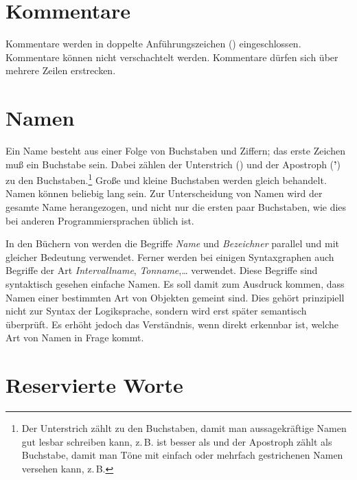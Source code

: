 \section{Kommentare}\label{sec:kommentare}
\label{zweizwei}

Kommentare werden in doppelte Anführungszeichen (\sourcecode{\dq})
eingeschlossen.
Kommentare  k\"onnen  nicht
verschachtelt werden.
Kommentare dürfen sich über mehrere Zeilen erstrecken.

\section{Namen}\label{sec:namen}
\label{zweidrei}

Ein Name besteht aus einer Folge von
Buchstaben und Ziffern;  das
erste Zeichen mu\ss{} ein Buchstabe sein.  Dabei z\"ahlen
der Unterstrich  (\sourcecode{_}) und der Apostroph
(\textbf{'})
zu den Buchstaben.\footnote{Der Unterstrich zählt zu den Buchstaben, damit
man aussagekräftige Namen gut lesbar schreiben kann, z.\,B.
 ist besser als
und der Apostroph zählt als Buchstabe,
damit man Töne mit einfach oder mehrfach gestrichenen
Namen versehen kann, z.\,B. }
Gro\ss{}e und kleine Buchstaben werden gleich behandelt.
Namen können beliebig lang sein.
Zur  Unterscheidung von Namen wird der gesamte Name herangezogen,
und nicht nur die ersten paar Buchstaben, wie dies bei anderen
Programmiersprachen üblich ist.

In den Büchern von \mutabor{} werden die Begriffe \emph{Name}
und \emph{Bezeichner}
parallel und mit gleicher Bedeutung verwendet. Ferner werden bei einigen
Syntaxgraphen auch Begriffe der Art \emph{Intervallname}, \emph{Tonname},\ldots
verwendet. Diese Begriffe sind syntaktisch gesehen einfache Namen.
Es soll damit zum Ausdruck kommen, dass Namen einer bestimmten Art von
Objekten gemeint sind. Dies gehört prinzipiell nicht zur Syntax der
Logiksprache, sondern wird erst später semantisch überprüft. Es erhöht
jedoch das Verständnis, wenn direkt erkennbar ist, welche Art von Namen
in Frage kommt.

\section{Reservierte Worte}\label{sec:reservierte-worte}
\label{zweivier}

